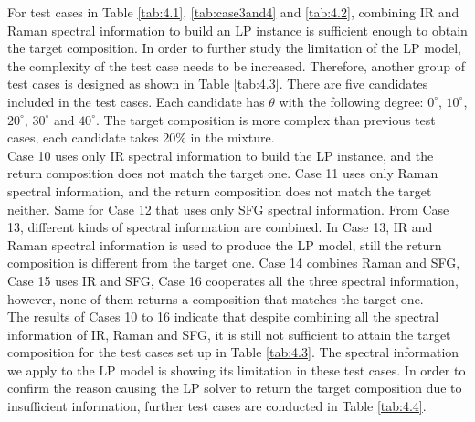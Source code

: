 For test cases in Table \ref{tab:4.1}, \ref{tab:case3and4} and \ref{tab:4.2}, combining IR and Raman spectral information to build an LP instance is sufficient enough to obtain the target composition. In order to further study the limitation of the LP model, the complexity of the test case needs to be increased. Therefore, another group of test cases is designed as shown in Table \ref{tab:4.3}. There are five candidates included in the test cases. Each candidate has $\theta$ with the following degree: $0^{\circ}$, $10^{\circ}$, $20^{\circ}$, $30^{\circ}$ and $40^{\circ}$. The target composition is more complex than previous test cases, each candidate takes 20\% in the mixture. \\

Case 10 uses only IR spectral information to build the LP instance, and the return composition does not match the target one. Case 11 uses only Raman spectral information, and the return composition does not match the target neither. Same for Case 12 that uses only SFG spectral information. From Case 13, different kinds of spectral information are combined. In Case 13, IR and Raman spectral information is used to produce the LP model, still the return composition is different from the target one. Case 14 combines Raman and SFG, Case 15 uses IR and SFG, Case 16 cooperates all the three spectral information, however, none of them returns a composition that matches the target one. \\

The results of Cases 10 to 16 indicate that despite combining all the spectral information of IR, Raman and SFG, it is still not sufficient to attain the target composition for the test cases set up in Table \ref{tab:4.3}. The spectral information we apply to the LP model is showing its limitation in these test cases. In order to confirm the reason causing the LP solver to return the target composition due to insufficient information, further test cases are conducted in Table \ref{tab:4.4}. \\

